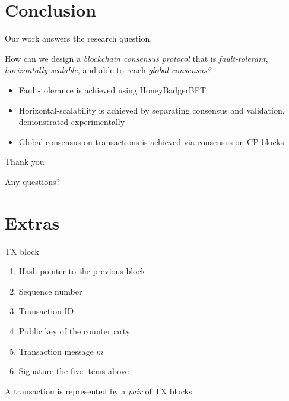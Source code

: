 \documentclass{beamer}
\begin{document}
\section{Conclusion}
\begin{frame}{\secname}
  Our work answers the research question.
  \begin{block}{}
    How can we design a \emph{blockchain consensus protocol} that is \emph{fault-tolerant},
    \emph{horizontally-scalable}, and able to reach \emph{global consensus?}
  \end{block}
  \begin{itemize}
    \item Fault-tolerance is achieved using HoneyBadgerBFT
    \item Horizontal-scalability is achieved by separating consensus and validation, demonstrated experimentally
    \item Global-consensus on transactions is achieved via consensus on CP blocks
  \end{itemize}
\end{frame}


\begin{frame}{Thank you}
  \begin{center}
  {\Large Any questions?}
  \end{center}
\end{frame}


\section*{Extras}
\begin{frame}[noframenumbering]{TX block}
  \begin{enumerate}
    \item Hash pointer to the previous block
    \item Sequence number
    \item Transaction ID
    \item Public key of the counterparty
    \item Transaction message $m$
    \item Signature the five items above
  \end{enumerate}
  \vfill
  A transaction is represented by a \emph{pair} of TX blocks
\end{frame}
\end{document}

